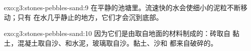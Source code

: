\begin{solution}{exo:g3:stones-pebbles-sand:9}
在平静的池塘里。流速快的水会使细小的泥粒不断移动；只有
在水几乎静止的地方，它们才会沉到底部。
\end{solution}

\begin{solution}{exo:g3:stones-pebbles-sand:10}
因为它们是由取自地面的材料制成的：砖取自
黏土，混凝土取自沙、和水泥，玻璃取自沙。黏土、沙和
都来自破碎的。
\end{solution}
